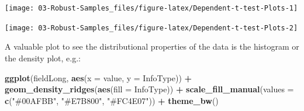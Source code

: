 \documentclass[
]{article}
\newenvironment{Shaded}{\begin{snugshade}}{\end{snugshade}}
\newcommand{\AttributeTok}[1]{\textcolor[rgb]{0.13,0.29,0.53}{#1}}
\newcommand{\CommentTok}[1]{\textcolor[rgb]{0.56,0.35,0.01}{\textit{#1}}}
\newcommand{\DecValTok}[1]{\textcolor[rgb]{0.00,0.00,0.81}{#1}}
\newcommand{\FunctionTok}[1]{\textcolor[rgb]{0.13,0.29,0.53}{\textbf{#1}}}
\newcommand{\NormalTok}[1]{#1}
\newcommand{\OtherTok}[1]{\textcolor[rgb]{0.56,0.35,0.01}{#1}}
\newcommand{\SpecialCharTok}[1]{\textcolor[rgb]{0.81,0.36,0.00}{\textbf{#1}}}
\newcommand{\StringTok}[1]{\textcolor[rgb]{0.31,0.60,0.02}{#1}}
\begin{document}
\begin{center}\texttt{[image: 03-Robust-Samples\_files/figure-latex/Dependent-t-test-Plots-1]} \end{center}

\begin{Shaded}
\end{Shaded}

\begin{center}\texttt{[image: 03-Robust-Samples\_files/figure-latex/Dependent-t-test-Plots-2]} \end{center}

\begin{Shaded}
\end{Shaded}

A valuable plot to see the distributional properties of the data is the histogram or the density plot, e.g.:

\begin{Shaded}
\begin{Highlighting}[]
    \FunctionTok{ggplot}\NormalTok{(fieldLong, }\FunctionTok{aes}\NormalTok{(}\AttributeTok{x =}\NormalTok{ value, }\AttributeTok{y =}\NormalTok{ InfoType)) }\SpecialCharTok{+}
    \FunctionTok{geom\_density\_ridges}\NormalTok{(}\FunctionTok{aes}\NormalTok{(}\AttributeTok{fill =}\NormalTok{ InfoType)) }\SpecialCharTok{+}
    \FunctionTok{scale\_fill\_manual}\NormalTok{(}\AttributeTok{values =} \FunctionTok{c}\NormalTok{(}\StringTok{"\#00AFBB"}\NormalTok{, }\StringTok{"\#E7B800"}\NormalTok{, }\StringTok{"\#FC4E07"}\NormalTok{)) }\SpecialCharTok{+} 
      \FunctionTok{theme\_bw}\NormalTok{()}
\end{Highlighting}
\end{Shaded}
\end{document}
